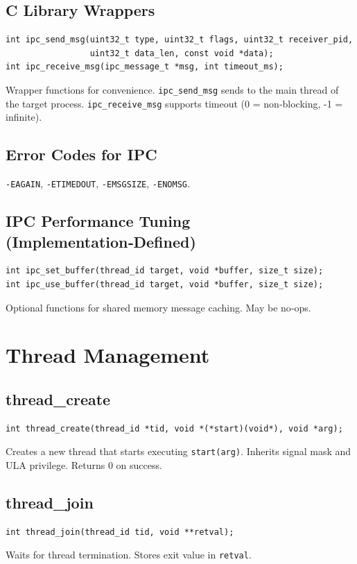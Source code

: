 \documentclass[12pt,a4paper]{article}
\begin{document}
\subsection{C Library Wrappers}
\begin{lstlisting}
int ipc_send_msg(uint32_t type, uint32_t flags, uint32_t receiver_pid,
                 uint32_t data_len, const void *data);
int ipc_receive_msg(ipc_message_t *msg, int timeout_ms);
\end{lstlisting}
Wrapper functions for convenience. \texttt{ipc\_send\_msg} sends to the main thread of the target process. \texttt{ipc\_receive\_msg} supports timeout (0 = non‑blocking, -1 = infinite).

\subsection{Error Codes for IPC}
\texttt{-EAGAIN}, \texttt{-ETIMEDOUT}, \texttt{-EMSGSIZE}, \texttt{-ENOMSG}.

\subsection{IPC Performance Tuning (Implementation‑Defined)}
\begin{lstlisting}
int ipc_set_buffer(thread_id target, void *buffer, size_t size);
int ipc_use_buffer(thread_id target, void *buffer, size_t size);
\end{lstlisting}
Optional functions for shared memory message caching. May be no‑ops.

\section{Thread Management}
\label{sec:threads}

\subsection{thread\_create}
\begin{lstlisting}
int thread_create(thread_id *tid, void *(*start)(void*), void *arg);
\end{lstlisting}
Creates a new thread that starts executing \texttt{start(arg)}. Inherits signal mask and ULA privilege. Returns 0 on success.

\subsection{thread\_join}
\begin{lstlisting}
int thread_join(thread_id tid, void **retval);
\end{lstlisting}
Waits for thread termination. Stores exit value in \texttt{retval}.
\end{document}
